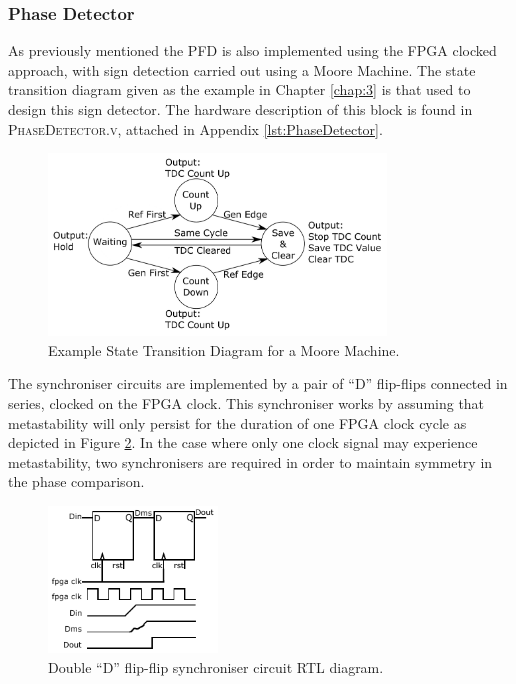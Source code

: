 \subsubsection{Phase Detector}
As previously mentioned the \ac{PFD} is also implemented using the \ac{FPGA} clocked approach, with sign detection carried out using a Moore Machine. The state transition diagram given as the example in Chapter \ref{chap:3} is that used to design this sign detector. The hardware description of this block is found in \textsc{PhaseDetector.v}, attached in Appendix \ref{lst:PhaseDetector}.
\begin{figure}[h]
    \centering
    \includegraphics[width=0.8\textwidth]{../state_trans_new}
    \caption[Example State Transition Diagram for a Moore Machine]{Example State Transition Diagram for a Moore Machine.}
    \label{fig:state_trans_reprint}
\end{figure}

The synchroniser circuits are implemented by a pair of ``D'' flip-flips connected in series, clocked on the \ac{FPGA} clock. This synchroniser works by assuming that metastability will only persist for the duration of one \ac{FPGA} clock cycle as depicted in Figure \ref{fig:synchroniser_behav}. In the case where only one clock signal may experience metastability, two synchronisers are required in order to maintain symmetry in the phase comparison.
\begin{figure}[h]
\centering
\includegraphics[width=0.4\textwidth]{../synchroniser_behav}
\caption[Double ``D'' flip-flip synchroniser circuit \ac{RTL} diagram]{Double ``D'' flip-flip synchroniser circuit \ac{RTL} diagram.}
\label{fig:synchroniser_behav}
\end{figure}

